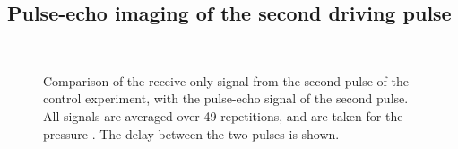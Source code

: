 \subsection{Pulse-echo imaging of the second driving pulse}




\begin{figure}[t]%
  \centering
 \quad\hspace{3mm}
  \\
 \quad\hspace{3mm}
\caption{
    Comparison of the  receive only signal from the second pulse of the control experiment,
    with the pulse-echo signal of the second pulse.
    All signals are averaged over 49 repetitions, and are taken for the pressure \pOOE.
    The delay between the two pulses is shown.
  }
  \label{fig:2nd:av:time:comp:control}
\end{figure}




